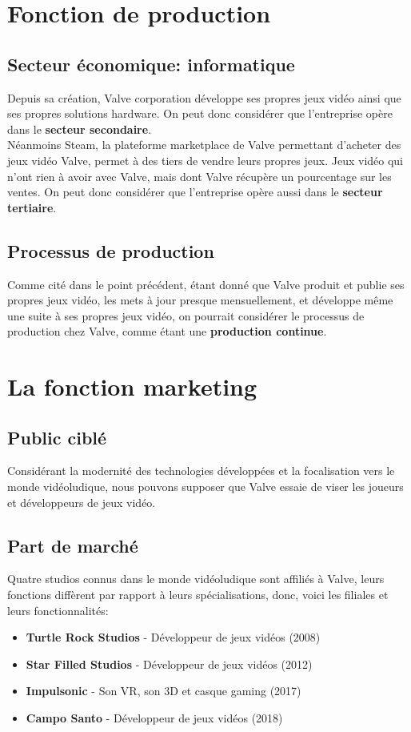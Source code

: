 \documentclass[12pt]{article}
\begin{document}
    \section{Fonction de production}
    \subsection{Secteur économique: informatique}
    Depuis sa création, Valve corporation développe ses propres jeux vidéo ainsi que ses propres solutions hardware. On peut donc considérer que l'entreprise opère dans le \textbf{secteur secondaire}.\\
    Néanmoins Steam, la plateforme marketplace de Valve permettant d'acheter des jeux vidéo Valve, permet à des tiers de vendre leurs propres jeux. Jeux vidéo qui n'ont rien à avoir avec Valve, mais dont Valve récupère un pourcentage sur les ventes. On peut donc considérer que l'entreprise opère aussi dans le \textbf{secteur tertiaire}.

    \subsection{Processus de production}
    Comme cité dans le point précédent, étant donné que Valve produit et publie ses propres jeux vidéo, les mets à jour presque mensuellement, et développe même une suite à ses propres jeux vidéo, on pourrait considérer le processus de production chez Valve, comme étant une \textbf{production continue}.

	\section{La fonction marketing}

    \subsection{Public ciblé}
    Considérant la modernité des technologies développées et la focalisation vers le monde vidéoludique, nous pouvons supposer que Valve essaie de viser les joueurs et développeurs de jeux vidéo.

	\subsection{Part de marché}
    Quatre studios connus dans le monde vidéoludique sont affiliés à Valve, leurs fonctions diffèrent par rapport à leurs spécialisations, donc, voici les filiales et leurs fonctionnalités:
    \begin{itemize}
        \item \textbf{Turtle Rock Studios} - Développeur de jeux vidéos (2008) \cite{turtle_rock_studios}
        \item \textbf{Star Filled Studios} - Développeur de jeux vidéos (2012) \cite{star_filled_studios}
        \item \textbf{Impulsonic} - Son VR, son 3D et casque gaming (2017) \cite{impulsonic}
        \item \textbf{Campo Santo} - Développeur de jeux vidéos (2018) \cite{campo_santo}
    \end{itemize}
\end{document}

